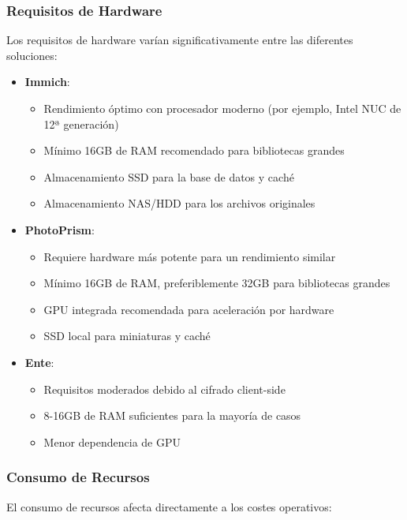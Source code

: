\subsubsection{Requisitos de Hardware}

Los requisitos de hardware varían significativamente entre las diferentes soluciones:

\begin{itemize}
    \item \textbf{Immich}:
    \begin{itemize}
        \item Rendimiento óptimo con procesador moderno (por ejemplo, Intel NUC de 12ª generación)
        \item Mínimo 16GB de RAM recomendado para bibliotecas grandes
        \item Almacenamiento SSD para la base de datos y caché
        \item Almacenamiento NAS/HDD para los archivos originales
    \end{itemize}

    \item \textbf{PhotoPrism}:
    \begin{itemize}
        \item Requiere hardware más potente para un rendimiento similar
        \item Mínimo 16GB de RAM, preferiblemente 32GB para bibliotecas grandes
        \item GPU integrada recomendada para aceleración por hardware
        \item SSD local para miniaturas y caché
    \end{itemize}

    \item \textbf{Ente}:
    \begin{itemize}
        \item Requisitos moderados debido al cifrado client-side
        \item 8-16GB de RAM suficientes para la mayoría de casos
        \item Menor dependencia de GPU
    \end{itemize}
\end{itemize}

\subsubsection{Consumo de Recursos}

El consumo de recursos afecta directamente a los costes operativos:

